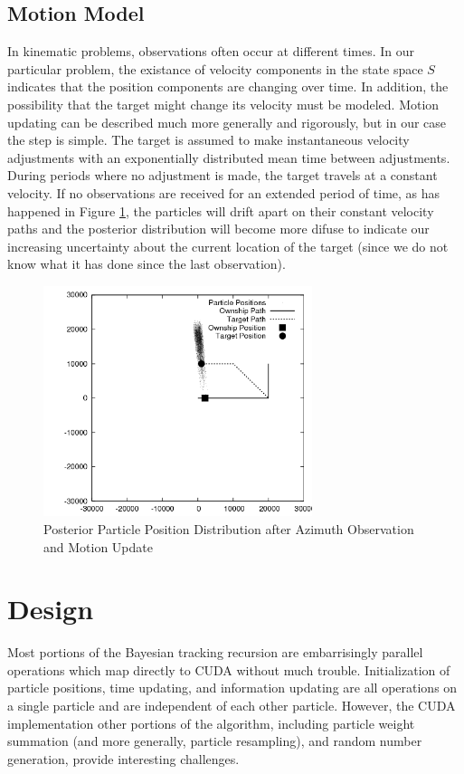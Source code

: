 \documentclass{article}
\begin{document}
\subsection{Motion Model}
In kinematic problems, observations often occur at different times. In our particular problem, the existance of velocity components in the state space \(S\) indicates that the position components are changing over time. In addition, the possibility that the target might change its velocity must be modeled. Motion updating can be described much more generally and rigorously, but in our case the step is simple. The target is assumed to make instantaneous velocity adjustments with an exponentially distributed mean time between adjustments. During periods where no adjustment is made, the target travels at a constant velocity. If no observations are received for an extended period of time, as has happened in Figure \ref{posterior2}, the particles will drift apart on their constant velocity paths and the posterior distribution will become more difuse to indicate our increasing uncertainty about the current location of the target (since we do not know what it has done since the last observation).

\begin{figure}
\centering
\includegraphics[width=0.7\textwidth]{data/particles_azimuth_obs.png}
\caption{Posterior Particle Position Distribution after Azimuth Observation and Motion Update}
\label{posterior2}
\end{figure}

\section{Design}
Most portions of the Bayesian tracking recursion are embarrisingly parallel operations which map directly to CUDA without much trouble. Initialization of particle positions, time updating, and information updating are all operations on a single particle and are independent of each other particle. However, the CUDA implementation other portions of the algorithm, including particle weight summation (and more generally, particle resampling), and random number generation, provide interesting challenges.
\end{document}
